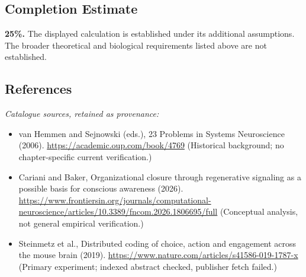 \documentclass[11pt]{article}
\begin{document}
\subsection{Completion Estimate}
\textbf{25\%.} The displayed calculation is established under its additional assumptions. The broader theoretical and biological requirements listed above are not established.
\subsection{References}
\noindent\emph{Catalogue sources, retained as provenance:}
\begin{itemize}
\item van Hemmen and Sejnowski (eds.), 23 Problems in Systems Neuroscience (2006). \url{https://academic.oup.com/book/4769} (Historical background; no chapter-specific current verification.)
\item Cariani and Baker, Organizational closure through regenerative signaling as a possible basis for conscious awareness (2026). \url{https://www.frontiersin.org/journals/computational-neuroscience/articles/10.3389/fncom.2026.1806695/full} (Conceptual analysis, not general empirical verification.)
\item Steinmetz et al., Distributed coding of choice, action and engagement across the mouse brain (2019). \url{https://www.nature.com/articles/s41586-019-1787-x} (Primary experiment; indexed abstract checked, publisher fetch failed.)
\end{itemize}
\end{document}
